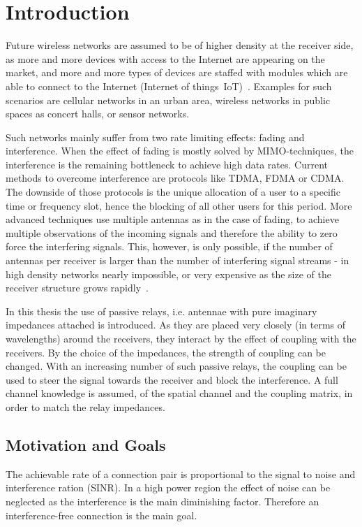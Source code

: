 \chapter{Introduction}
\label{sec:introduction}

Future wireless networks are assumed to be of higher density at the receiver side, as more and more devices with access to the Internet are appearing on the market, and more and more types of devices are staffed with modules which are able to connect to the Internet (Internet of things~IoT)~\cite{rusek13}.
Examples for such scenarios are cellular networks in an urban area, wireless networks in public spaces as concert halls, or sensor networks.

Such networks mainly suffer from two rate limiting  effects: fading and interference.
When the effect of fading is mostly solved by MIMO-techniques, the interference is the remaining bottleneck to achieve high data rates.
Current methods to overcome interference are protocols like TDMA, FDMA or CDMA.
The downside of those protocols is the unique allocation of a user to a specific time or frequency slot, hence the blocking of all other users for this period.
More advanced techniques use multiple antennas as in the case of fading, to achieve multiple observations of the incoming signals and therefore the ability to zero force the interfering signals.
This, however, is only possible, if the number of antennas per receiver is larger than the number of interfering signal streams - in high density networks nearly impossible, or very expensive as the size of the receiver structure grows rapidly~\cite{rusek13}.

In this thesis the use of passive relays, i.e. antennae with pure imaginary impedances attached is introduced.
As they are placed very closely (in terms of wavelengths) around the receivers, they interact by the effect of coupling with the receivers.
By the choice of the impedances, the strength of coupling can be changed.
With an increasing number of such passive relays, the coupling can be used to steer the signal towards the receiver and block the interference.
A full channel knowledge is assumed, of the spatial channel and the coupling matrix, in order to match the relay impedances.

\section{Motivation and Goals}
\label{sec:motivation}

The achievable rate of a connection pair is proportional to the signal to noise and interference ration (SINR).
In a high power region the effect of noise can be neglected as the interference is the main diminishing factor.
Therefore an interference-free connection is the main goal.

